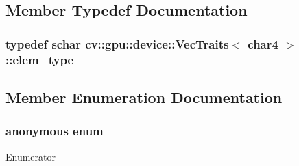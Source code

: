 \subsection{Member Typedef Documentation}
\hypertarget{structcv_1_1gpu_1_1device_1_1VecTraits_3_01char4_01_4_ab227d0d90450e8240033110ea370be32}{
\subsubsection[{elem\-\_\-type}]{\setlength{\rightskip}{0pt plus 5cm}typedef {\bf schar} {\bf cv\-::gpu\-::device\-::\-Vec\-Traits}$<$ char4 $>$\-::{\bf elem\-\_\-type}}}\label{structcv_1_1gpu_1_1device_1_1VecTraits_3_01char4_01_4_ab227d0d90450e8240033110ea370be32}


\subsection{Member Enumeration Documentation}
\hypertarget{structcv_1_1gpu_1_1device_1_1VecTraits_3_01char4_01_4_a4d6a69e7087ca3431640b67bb3fe6bd0}{\subsubsection[{anonymous enum}]{\setlength{\rightskip}{0pt plus 5cm}anonymous enum}}\label{structcv_1_1gpu_1_1device_1_1VecTraits_3_01char4_01_4_a4d6a69e7087ca3431640b67bb3fe6bd0}
\begin{Desc}
\item[Enumerator]\par
\begin{description}
\item[{\em 
\hypertarget{structcv_1_1gpu_1_1device_1_1VecTraits_3_01char4_01_4_a4d6a69e7087ca3431640b67bb3fe6bd0aecec29501c6201526a7f637d07cfd3fc}{cn}\label{structcv_1_1gpu_1_1device_1_1VecTraits_3_01char4_01_4_a4d6a69e7087ca3431640b67bb3fe6bd0aecec29501c6201526a7f637d07cfd3fc}
}]\end{description}
\end{Desc}



